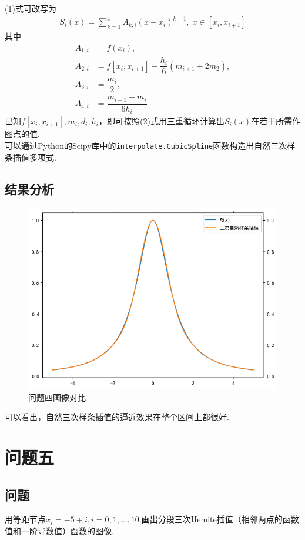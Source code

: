 \documentclass[UTF8,ctexart,a4paper,11pt,openany]{article}
\theoremstyle{definition}
\begin{document}
    (1)式可改写为
    \begin{align}
        S_i(x)=\sum_{k=1}^4 A_{k,i}(x-x_i)^{k-1},\;x\in [x_i,x_{i+1}]
    \end{align}
    其中
    \begin{align*}
        A_{1,i}&=f(x_i),\\
        A_{2,i}&=f[x_i,x_{i+1}]-\dfrac{h_i}{6}(m_{i+1}+2m_2),\\
        A_{3,i}&=\dfrac{m_i}{2},\\
        A_{4,i}&=\dfrac{m_{i+1}-m_i}{6h_i}
    \end{align*}
    已知$f[x_i,x_{i+1}],m_i,d_i,h_i$，即可按照(2)式用三重循环计算出$S_i(x)$在若干所需作图点的值.\\ \indent
    可以通过Python的Scipy库中的\texttt{interpolate.CubicSpline}函数构造出自然三次样条插值多项式.
    \subsection{结果分析}%
    \begin{figure}[H]
        \centering
        \includegraphics{pics/P3.4.png}
        \caption{问题四图像对比}
        \label{graph:1}
        \end{figure}
    可以看出，自然三次样条插值的逼近效果在整个区间上都很好.
\section{问题五}
    \subsection{问题}
    用等距节点$x_i=-5+i, i=0,1,...,10.$画出分段三次Hemite插值（相邻两点的函数值和一阶导数值）函数的图像.
\end{document}
